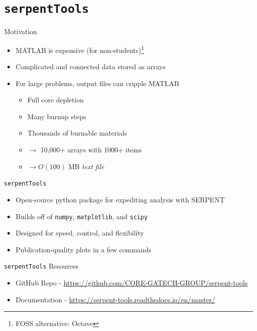 \documentclass{beamer}
\newcommand{\st}{\texttt{serpentTools} }
\begin{document}
\section{\st}

\begin{frame}{Motivation}
    \begin{itemize}
        \item MATLAB is expensive (for non-students)\footnote{FOSS alternative: Octave}
        \item Complicated and connected data stored as arrays
        \item For large problems, output files can cripple MATLAB
        \begin{itemize}
            \item Full core depletion
            \item Many burnup steps
            \item Thousands of burnable materials
            \item $\rightarrow$ 10,000+ arrays with 1000+ items
            \item $\rightarrow O(100)$ MB \textit{text file}
        \end{itemize}
    \end{itemize}
\end{frame}

\begin{frame}{\st}
    \begin{itemize}
        \item Open-source python package for expediting analysis with SERPENT
        \item Builds off of \texttt{numpy}, \texttt{matplotlib}, and \texttt{scipy}
        \item Designed for speed, control, and flexibility
        \item Publication-quality plots in a few commands
    \end{itemize}
\end{frame}


\begin{frame}{\st Resources}
    \begin{itemize}
        \item GitHub Repo - \url{https://github.com/CORE-GATECH-GROUP/serpent-tools}
        \item Documentation - \url{https://serpent-tools.readthedocs.io/en/master/}
    \end{itemize}
\end{frame}
\end{document}
